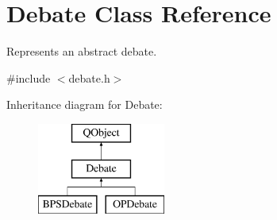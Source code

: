 \hypertarget{classDebate}{\section{Debate Class Reference}
\label{classDebate}
}


Represents an abstract debate.  




{\ttfamily \#include $<$debate.\-h$>$}

Inheritance diagram for Debate\-:\begin{figure}[H]
\begin{center}
\leavevmode
\includegraphics[height=3.000000cm]{classDebate}
\end{center}
\end{figure}
